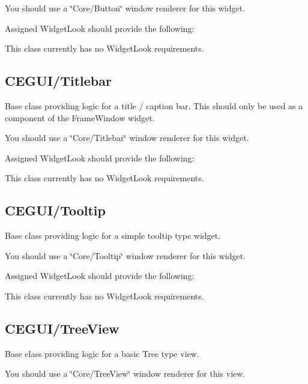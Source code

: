 You should use a \char`\"{}\+Core/\+Button\char`\"{} window renderer for this widget.

Assigned Widget\+Look should provide the following\+: 
\begin{DoxyItemize}
\item This class currently has no Widget\+Look requirements. 
\end{DoxyItemize}\hypertarget{fal_baseclass_ref_fal_baseclass_ref_sec_28}{}\subsection{C\+E\+G\+U\+I/\+Titlebar}\label{fal_baseclass_ref_fal_baseclass_ref_sec_28}
Base class providing logic for a title / caption bar. This should only be used as a component of the Frame\+Window widget.

You should use a \char`\"{}\+Core/\+Titlebar\char`\"{} window renderer for this widget.

Assigned Widget\+Look should provide the following\+: 
\begin{DoxyItemize}
\item This class currently has no Widget\+Look requirements. 
\end{DoxyItemize}\hypertarget{fal_baseclass_ref_fal_baseclass_ref_sec_29}{}\subsection{C\+E\+G\+U\+I/\+Tooltip}\label{fal_baseclass_ref_fal_baseclass_ref_sec_29}
Base class providing logic for a simple tooltip type widget.

You should use a \char`\"{}\+Core/\+Tooltip\char`\"{} window renderer for this widget.

Assigned Widget\+Look should provide the following\+: 
\begin{DoxyItemize}
\item This class currently has no Widget\+Look requirements. 
\end{DoxyItemize}\hypertarget{fal_baseclass_ref_fal_baseclass_ref_sec_30}{}\subsection{C\+E\+G\+U\+I/\+Tree\+View}\label{fal_baseclass_ref_fal_baseclass_ref_sec_30}
Base class providing logic for a basic Tree type view.

You should use a \char`\"{}\+Core/\+Tree\+View\char`\"{} window renderer for this view.


